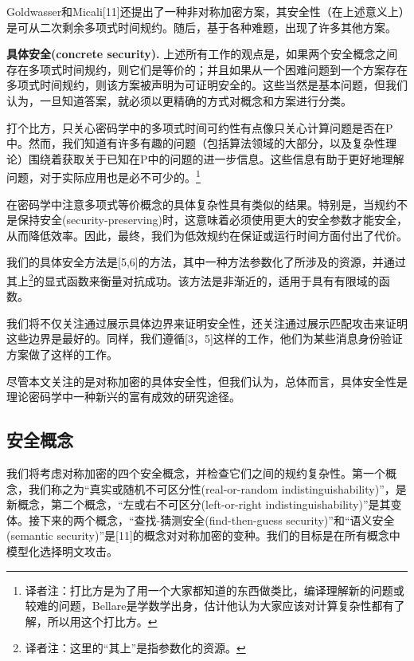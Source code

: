 \documentclass[]{article}
\begin{document}
Goldwasser和Micali[11]还提出了一种非对称加密方案，其安全性（在上述意义上）是可从二次剩余多项式时间规约。随后，基于各种难题，出现了许多其他方案。\par

\textbf{{\large 具体安全(concrete security).}}
上述所有工作的观点是，如果两个安全概念之间存在多项式时间规约，则它们是等价的；并且如果从一个困难问题到一个方案存在多项式时间规约，则该方案被声明为可证明安全的。这些当然是基本问题，但我们认为，一旦知道答案，就必须以更精确的方式对概念和方案进行分类。\par

打个比方，只关心密码学中的多项式时间可约性有点像只关心计算问题是否在P中。然而，我们知道有许多有趣的问题（包括算法领域的大部分，以及复杂性理论）围绕着获取关于已知在P中的问题的进一步信息。这些信息有助于更好地理解问题，对于实际应用也是必不可少的。\footnote{译者注：打比方是为了用一个大家都知道的东西做类比，编译理解新的问题或较难的问题，Bellare是学数学出身，估计他认为大家应该对计算复杂性都有了解，所以用这个打比方。}
\par

在密码学中注意多项式等价概念的具体复杂性具有类似的结果。特别是，当规约不是保持安全(security-preserving)时，这意味着必须使用更大的安全参数才能安全，从而降低效率。因此，最终，我们为低效规约在保证或运行时间方面付出了代价。\par

我们的具体安全方法是[5,6]的方法，其中一种方法参数化了所涉及的资源，并通过其上\footnote{译者注：这里的“其上”是指参数化的资源。}的显式函数来衡量对抗成功。该方法是非渐近的，适用于具有有限域的函数。\par

我们将不仅关注通过展示具体边界来证明安全性，还关注通过展示匹配攻击来证明这些边界是最好的。同样，我们遵循[3，5]这样的工作，他们为某些消息身份验证方案做了这样的工作。\par

尽管本文关注的是对称加密的具体安全性，但我们认为，总体而言，具体安全性是理论密码学中一种新兴的富有成效的研究途径。

\subsection{安全概念}
我们将考虑对称加密的四个安全概念，并检查它们之间的规约复杂性。第一个概念，我们称之为“真实或随机不可区分性(real-or-random indistinguishability)”，是新概念，第二个概念，“左或右不可区分(left-or-right indistinguishability)”是其变体。接下来的两个概念，“查找-猜测安全(find-then-guess security)”和“语义安全(semantic security)”是[11]的概念对对称加密的变种。我们的目标是在所有概念中模型化选择明文攻击。\par
\end{document}
